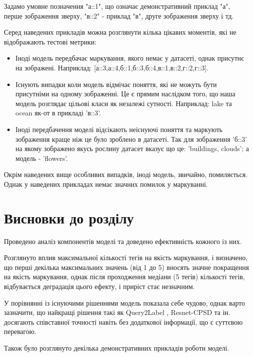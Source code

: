 \documentclass{udstu}
\begin{document}
Задамо умовне позначення "а::1", що означає демонстративний приклад "а", перше зображення зверху,
"в::2" - приклад "в", друге зображення зверху і тд.

Серед наведених прикладів можна розглянути кілька цікавих моментів, які не відображають тестові метрики:

\begin{itemize}[*]
	\item Іноді модель передбачає маркування, якого немає у датасеті, однак присутнє на зображені.
	Наприклад: [а::3,а::4,б::1,б::3,б::4,в::1,в::2,г::2,г::3].
	\item Існують випадки коли модель відмічає поняття, які не можуть бути присутніми на одному зображенні.
	Це є прямим наслідком того, що наша модель розглядає цільові класи як незалежі сутності.
	Наприклад: lake та ocean як-от в прикладі 'в::3'.
	\item Іноді передбачення моделі відсікають неіснуючі поняття та маркують зображення краще ніж це
	було зроблено в датасеті. Так для зображення 'б::3' на якому зображено якусь рослину датасет
	вказує що це: 'buildings, clouds'; а модель - 'flowers'.
\end{itemize}

Окрім наведених вище особливих випадків, іноді модель, звичайно, помиляється. Однак у наведених
прикладах немає значних помилок у маркуванні.


\section{Висновки до розділу}

Проведено аналіз компонентів моделі та доведено ефективність кожного із них.

Розглянуто вплив максимальної кількості тегів на якість маркування, і визначено,
що перші декілька максимальних значень (від 1 до 5) вносять значне покращення на якість маркування,
однак після проходження медіани (5 тегів) кількості тегів,
відбувається деградація цього ефекту, і приріст стає незначним.

У порівнянні із існуючими рішеннями модель показала себе чудово, однак варто зазначити, що
найкращі рішення такі як Query2Label \cite{q2l}, Resnet-CPSD \cite{cpsd} та ін. досягають
співставної точності навіть без додаткової інформації, що є суттєвою перевагою.

Також було розглянуто декілька демонстративних прикладів роботи моделі.


\conclusions
\end{document}
